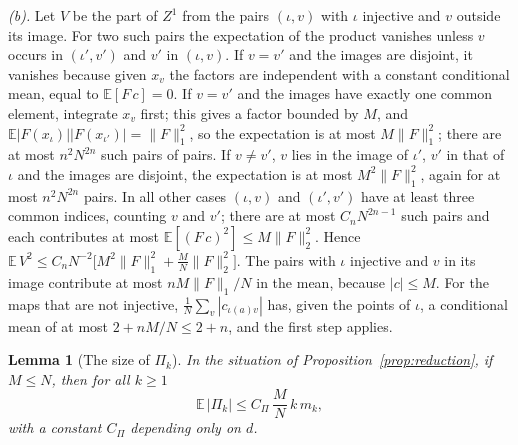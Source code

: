 \documentclass[11pt,a4paper]{article}
\makeatletter
\theoremstyle{stmt}
\newtheorem{lemma}[theorem]{Lemma}
\theoremstyle{defn}
\theoremstyle{rmk}
\renewenvironment{proof}[1][\proofname]{\par\pushQED{\qed}\normalfont\topsep6\p@\@plus6\p@\relax
  \trivlist\item[\hskip\labelsep{\sffamily\itshape\small #1.}]\ignorespaces}{\popQED\endtrivlist\@endpefalse}
\numberwithin{equation}{section}
\makeatother
\begin{document}
{\begin{proof}
\emph{(b).} Let $V$ be the part of $Z^1$ from the pairs $(\iota,v)$ with $\iota$ injective and $v$ outside its image. For two such pairs the expectation of the product vanishes unless $v$ occurs in $(\iota',v')$ and $v'$ in $(\iota,v)$. If $v=v'$ and the images are disjoint, it vanishes because given $x_v$ the factors are independent with a constant conditional mean, equal to $\mathbb E[F\,c]=0$. If $v=v'$ and the images have exactly one common element, integrate $x_v$ first; this gives a factor bounded by $M$, and $\mathbb E|F(x_\iota)||F(x_{\iota'})|=\|F\|_1^2$, so the expectation is at most $M\|F\|_1^2$; there are at most $n^2N^{2n}$ such pairs of pairs. If $v\ne v'$, $v$ lies in the image of $\iota'$, $v'$ in that of $\iota$ and the images are disjoint, the expectation is at most $M^2\|F\|_1^2$, again for at most $n^2N^{2n}$ pairs. In all other cases $(\iota,v)$ and $(\iota',v')$ have at least three common indices, counting $v$ and $v'$; there are at most $C_nN^{2n-1}$ such pairs and each contributes at most $\mathbb E[(F\,c)^2]\le M\|F\|_2^2$. Hence $\mathbb E\,V^2\le C_nN^{-2}\big[M^2\|F\|_1^2+\frac MN\|F\|_2^2\big]$. The pairs with $\iota$ injective and $v$ in its image contribute at most $nM\|F\|_1/N$ in the mean, because $|c|\le M$. For the maps that are not injective, $\frac1N\sum_v|c_{\iota(a)v}|$ has, given the points of $\iota$, a conditional mean of at most $2+nM/N\le2+n$, and the first step applies.
\end{proof}

\begin{lemma}[The size of $\Pi_k$]\label{lem:pibound}
In the situation of Proposition~\ref{prop:reduction}, if $M\le N$, then for all $k\ge1$
\[
\mathbb E\,|\Pi_k|\le C_\Pi\,\frac MN\,k\,m_k,
\]
with a constant $C_\Pi$ depending only on $d$.
\end{lemma}

}
\end{document}
